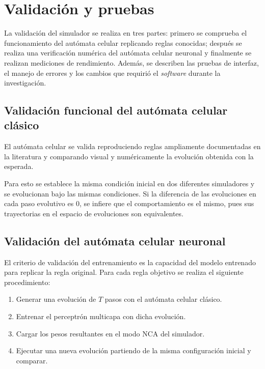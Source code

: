\section{Validación y pruebas}

La validación del simulador se realiza en tres partes: primero se comprueba el funcionamiento del autómata celular replicando reglas conocidas; después se realiza una verificación numérica del autómata celular neuronal y finalmente se realizan mediciones de rendimiento. Además, se describen las pruebas de interfaz, el manejo de errores y los cambios que requirió el \textit{software} durante la investigación.

\subsection{Validación funcional del autómata celular clásico}

El autómata celular se valida reproduciendo reglas ampliamente documentadas en la literatura y comparando visual y numéricamente la evolución obtenida con la esperada.

Para esto se establece la misma condición inicial en dos diferentes simuladores y se evolucionan bajo las mismas condiciones. Si la diferencia de las evoluciones en cada paso evolutivo es $0$, se infiere que el comportamiento es el mismo, pues sus trayectorias en el espacio de evoluciones son equivalentes.

\subsection{Validación del autómata celular neuronal}

El criterio de validación del entrenamiento es la capacidad del modelo entrenado para replicar la regla original. Para cada regla objetivo se realiza el siguiente procedimiento:

\begin{enumerate}
    \item Generar una evolución de $T$ pasos con el autómata celular clásico.
    \item Entrenar el perceptrón multicapa con dicha evolución.
    \item Cargar los pesos resultantes en el modo NCA del simulador.
    \item Ejecutar una nueva evolución partiendo de la misma configuración inicial y comparar.
\end{enumerate}

